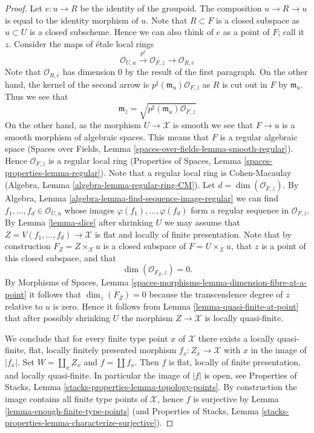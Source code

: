 \documentclass{stacks-project}
\theoremstyle{plain}
\theoremstyle{definition}
\theoremstyle{remark}
\numberwithin{equation}{subsection}
\begin{document}
\begin{proof}
\medskip\noindent
Let $e : u \to R$ be the identity of the groupoid. The composition
$u \to R \to u$ is equal to the identity morphism of $u$.
Note that $R \subset F$ is a closed
subspace as $u \subset U$ is a closed subscheme. Hence we can also think
of $e$ as a point of $F$; call it $z$.
Consider the maps of \'etale local rings
$$
\mathcal{O}_{U, u}
\xrightarrow{p^\sharp}
\mathcal{O}_{F, \overline{z}}
\longrightarrow
\mathcal{O}_{R, \overline{e}}
$$
Note that $\mathcal{O}_{R, \overline{e}}$ has dimension $0$ by the result
of the first paragraph. On the other hand, the kernel of the second arrow is
$p^\sharp(\mathfrak m_u)\mathcal{O}_{F, \overline{z}}$ as
$R$ is cut out in $F$ by $\mathfrak m_u$. Thus we see that
$$
\mathfrak m_{\overline{z}} =
\sqrt{p^\sharp(\mathfrak m_u)\mathcal{O}_{F, \overline{z}}}
$$
On the other hand, as the morphism $U \to \mathcal{X}$ is smooth
we see that $F \to u$ is a smooth morphism of algebraic spaces.
This means that $F$ is a regular algebraic space
(Spaces over Fields, Lemma \ref{spaces-over-fields-lemma-smooth-regular}).
Hence $\mathcal{O}_{F, \overline{z}}$ is a regular local ring
(Properties of Spaces, Lemma \ref{spaces-properties-lemma-regular}).
Note that a regular local ring is Cohen-Macaulay
(Algebra, Lemma \ref{algebra-lemma-regular-ring-CM}).
Let $d = \dim(\mathcal{O}_{F, \overline{z}})$. By
Algebra, Lemma \ref{algebra-lemma-find-sequence-image-regular}
we can find $f_1, \ldots, f_d \in \mathcal{O}_{U, u}$ whose images
$\varphi(f_1), \ldots, \varphi(f_d)$ form a regular sequence
in $\mathcal{O}_{F, \overline{z}}$. By
Lemma \ref{lemma-slice}
after shrinking $U$ we may assume that
$Z = V(f_1, \ldots, f_d) \to \mathcal{X}$ is flat and
locally of finite presentation. Note that by construction
$F_Z = Z \times_\mathcal{X} u$ is a closed subspace of
$F = U \times_\mathcal{X} u$, that $z$ is a point of this closed subspace,
and that
$$
\dim(\mathcal{O}_{F_Z, \overline{z}}) = 0.
$$
By
Morphisms of Spaces,
Lemma \ref{spaces-morphisms-lemma-dimension-fibre-at-a-point}
it follows that $\dim_z(F_Z) = 0$ because the transcendence degree
of $z$ relative to $u$ is zero. Hence it follows from
Lemma \ref{lemma-quasi-finite-at-point}
that after possibly shrinking $U$ the morphism $Z \to \mathcal{X}$
is locally quasi-finite.

\medskip\noindent
We conclude that for every finite type point $x$ of $\mathcal{X}$ there
exists a locally quasi-finite, flat, locally finitely presented
morphism $f_x : Z_x \to \mathcal{X}$ with $x$ in the image of $|f_x|$.
Set $W = \coprod_x Z_x$ and $f = \coprod f_x$. Then $f$ is flat, locally
of finite presentation, and locally quasi-finite. In particular the
image of $|f|$ is open, see
Properties of Stacks, Lemma \ref{stacks-properties-lemma-topology-points}.
By construction the image contains all finite type points of $\mathcal{X}$,
hence $f$ is surjective by
Lemma \ref{lemma-enough-finite-type-points} (and
Properties of Stacks, Lemma
\ref{stacks-properties-lemma-characterize-surjective}).
\end{proof}
\end{document}

